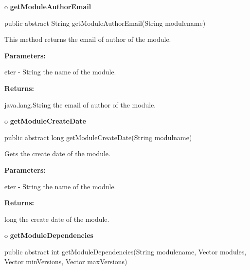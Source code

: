 o {\bf getModuleAuthorEmail} 

\begin{PRE}
 public abstract String getModuleAuthorEmail(String modulename)
\end{PRE}

\begin{description}
\htmlDD This method returns the email of author of the module. 

\begin{description}
\item {\bf Parameters:}  

eter - String the name of the module.  
\item {\bf Returns:}  

java.lang.String the email of author of the module.  
\end{description}

\end{description}

o {\bf getModuleCreateDate} 

\begin{PRE}
 public abstract long getModuleCreateDate(String modulname)
\end{PRE}

\begin{description}
\htmlDD Gets the create date of the module. 

\begin{description}
\item {\bf Parameters:}  

eter - String the name of the module.  
\item {\bf Returns:}  

long the create date of the module.  
\end{description}

\end{description}

o {\bf getModuleDependencies} 

\begin{PRE}
 public abstract int getModuleDependencies(String modulename,
                                           Vector modules,
                                           Vector minVersions,
                                           Vector maxVersions)
\end{PRE}

